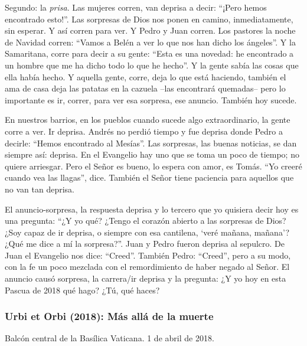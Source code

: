 			\begin{body}Segundo: la \textit{prisa}. Las mujeres corren, van deprisa a decir: “¡Pero hemos encontrado esto!”. Las sorpresas de Dios nos ponen en camino, inmediatamente, sin esperar. Y así corren para ver. Y Pedro y Juan corren. Los pastores la noche de Navidad corren: “Vamos a Belén a ver lo que nos han dicho los ángeles”. Y la Samaritana, corre para decir a su gente: “Esta es una novedad: he encontrado a un hombre que me ha dicho todo lo que he hecho”. Y la gente sabía las cosas que ella había hecho. Y aquella gente, corre, deja lo que está haciendo, también el ama de casa deja las patatas en la cazuela –las encontrará quemadas– pero lo importante es ir, correr, para ver esa sorpresa, ese anuncio. También hoy sucede.\end{body}
			
			\begin{body}En nuestros barrios, en los pueblos cuando sucede algo extraordinario, la gente corre a ver. Ir deprisa. Andrés no perdió tiempo y fue deprisa donde Pedro a decirle: “Hemos encontrado al Mesías”. Las sorpresas, las buenas noticias, se dan siempre así: deprisa. En el Evangelio hay uno que se toma un poco de tiempo; no quiere arriesgar. Pero el Señor es bueno, lo espera con amor, es Tomás. “Yo creeré cuando vea las llagas”, dice. También el Señor tiene paciencia para aquellos que no van tan deprisa.\end{body}
			
			\begin{body}El anuncio-sorpresa, la respuesta deprisa y lo tercero que yo quisiera decir hoy es una pregunta: “¿Y yo qué? ¿Tengo el corazón abierto a las sorpresas de Dios? ¿Soy capaz de ir deprisa, o siempre con esa cantilena, ‘veré mañana, mañana’? ¿Qué me dice a mí la sorpresa?”. Juan y Pedro fueron deprisa al sepulcro. De Juan el Evangelio nos dice: “Creed”. También Pedro: “Creed”, pero a su modo, con la fe un poco mezclada con el remordimiento de haber negado al Señor. El anuncio causó sorpresa, la carrera/ir deprisa y la pregunta: ¿Y yo hoy en esta Pascua de 2018 qué hago? ¿Tú, qué haces?\end{body}
			
			\subsubsection{Urbi et Orbi (2018): Más allá de la muerte}
			
			\begin{referencia}Balcón central de la Basílica Vaticana. 1 de abril de 2018.\end{referencia}
			
